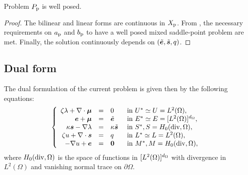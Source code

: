 \begin{theorem}
    Problem $P_\mathrm{p}$ is well posed.
\end{theorem}

\begin{proof}
The bilinear and linear forms are continuous in $X_\mathrm{p}$. %
From \cite[Thm. 3.1]{Balbao2025}, the necessary requirements on $a_\mathrm{p}$ and $b_\mathrm{p}$ to have a well posed mixed saddle-point problem are met. Finally, the solution continuously depends on $(\tilde{\bm{e}},\tilde{\bm{s}},q)$.
\end{proof}

\subsection{Dual form}

The dual formulation of the current problem is given then by the following equations:
$$
\left\lbrace
\begin{array}{rcll}
    \zeta\lambda+\nabla\cdot\bm{\mu} &=& 0          & \text{ in } U^* \simeq U = L^2(\Omega),\\
    \bm{e}+\bm{\mu}                 &=& \tilde{\bm{e}}       & \text{ in } E^* \simeq E = [L^2(\Omega)]^{d_\Omega},\\   
    \kappa\bm{s}-\nabla\lambda     &=& \kappa\tilde{\bm{s}} & \text{ in } S^*,       S = H_0(\mathrm{div},\Omega),\\
    \zeta u+\nabla\cdot\bm{s} &=& q          & \text{ in } L^* \simeq L = L^2(\Omega),\\
    -\nabla u+\bm{e}          &=& \bm{0}      & \text{ in } M^*,       M = H_0(\mathrm{div},\Omega),
\end{array}
\right.
$$
where $H_0(\mathrm{div},\Omega)$ is the space of functions in $[L^2(\Omega)]^{d_\Omega}$ with divergence in $L^2(\Omega)$ and vanishing normal trace on $\partial\Omega$.

